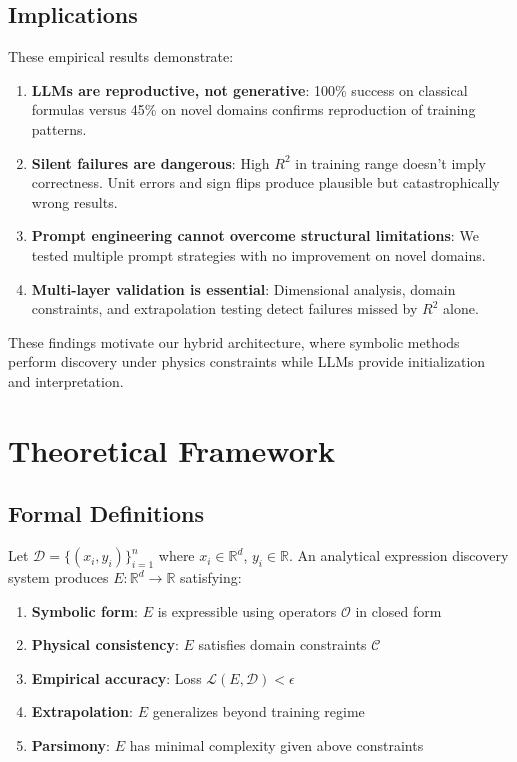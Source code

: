 \documentclass[twoside,11pt]{article}
\newcommand{\R}{\mathbb{R}}
\begin{document}
\subsection{Implications}

These empirical results demonstrate:

\begin{enumerate}
\item \textbf{LLMs are reproductive, not generative}: 100\% success on classical formulas versus 45\% on novel domains confirms reproduction of training patterns\citep{kambhampati2024llms}.

\item \textbf{Silent failures are dangerous}: High $R^2$ in training range doesn't imply correctness. Unit errors and sign flips produce plausible but catastrophically wrong results.

\item \textbf{Prompt engineering cannot overcome structural limitations}: We tested multiple prompt strategies with no improvement on novel domains.

\item \textbf{Multi-layer validation is essential}: Dimensional analysis, domain constraints, and extrapolation testing detect failures missed by $R^2$ alone.
\end{enumerate}

These findings motivate our hybrid architecture, where symbolic methods perform discovery under physics constraints while LLMs provide initialization and interpretation\citep{koza1994genetic}\citep{kambhampati2024llms}.

\section{Theoretical Framework}
\label{sec:theory}

\subsection{Formal Definitions}

\begin{definition}
\label{def:analytical_discovery}
Let $\mathcal{D} = \{(x_i, y_i)\}_{i=1}^n$ where $x_i \in \R^d$, $y_i \in \R$\citep{koza1994genetic}. An analytical expression discovery system produces $E: \R^d \to \R$ satisfying:
\begin{enumerate}
\item \textbf{Symbolic form}: $E$ is expressible using operators $\mathcal{O}$ in closed form
\item \textbf{Physical consistency}: $E$ satisfies domain constraints $\mathcal{C}$
\item \textbf{Empirical accuracy}: Loss $\mathcal{L}(E, \mathcal{D}) < \epsilon$
\item \textbf{Extrapolation}: $E$ generalizes beyond training regime
\item \textbf{Parsimony}: $E$ has minimal complexity given above constraints
\end{enumerate}
\end{definition}
\end{document}
